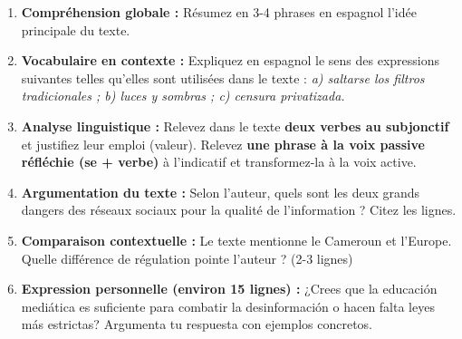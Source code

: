 \documentclass[11pt]{article}
\begin{document}
\begin{exercice}
\begin{enumerate}
    \item \textbf{Compréhension globale :} Résumez en 3-4 phrases en espagnol l'idée principale du texte.
    \item \textbf{Vocabulaire en contexte :} Expliquez en espagnol le sens des expressions suivantes telles qu'elles sont utilisées dans le texte : \emph{a) saltarse los filtros tradicionales ; b) luces y sombras ; c) censura privatizada.}
    \item \textbf{Analyse linguistique :} Relevez dans le texte \textbf{deux verbes au subjonctif} et justifiez leur emploi (valeur). Relevez \textbf{une phrase à la voix passive réfléchie (se + verbe)} à l'indicatif et transformez-la à la voix active.
    \item \textbf{Argumentation du texte :} Selon l'auteur, quels sont les deux grands dangers des réseaux sociaux pour la qualité de l'information ? Citez les lignes.
    \item \textbf{Comparaison contextuelle :} Le texte mentionne le Cameroun et l'Europe. Quelle différence de régulation pointe l'auteur ? (2-3 lignes)
    \item \textbf{Expression personnelle (environ 15 lignes) :} \og ¿Crees que la educación mediática es suficiente para combatir la desinformación o hacen falta leyes más estrictas? Argumenta tu respuesta con ejemplos concretos. \fg
\end{enumerate}
\end{exercice}
\end{document}
